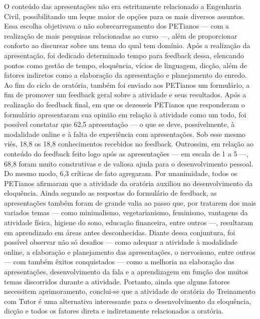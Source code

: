 O conteúdo das apresentações não era estritamente relacionado a Engenharia Civil, 
possibilitando um leque maior de opções para os mais diversos assuntos. Essa escolha objetivava 
o não sobrecarregamento dos PETianos — com a realização de mais pesquisas relacionadas ao 
curso —, além de proporcionar conforto ao discursar sobre um tema do qual tem domínio.
Após a realização da apresentação, foi dedicado determinado tempo para feedback dessa, 
elencando pontos como gestão de tempo, eloquência, vícios de linguagem, dicção, além de fatores 
indiretos como a elaboração da apresentação e planejamento do enredo. Ao fim do ciclo de 
oratória, também foi enviado aos PETianos um formulário, a fim de promover um feedback geral 
sobre a atividade e seus resultados.
Após a realização do feedback final, em que os dezesseis PETianos que responderam o 
formulário apresentaram sua opinião em relação à atividade como um todo, foi possível constatar 
que 62,5%
apresentação — o que se deve, possivelmente, à modalidade online e à falta de experiência com 
apresentações. Sob esse mesmo viés, 18,8%
os 18,8%
conhecimentos recebidos no feedback. 
Outrossim, em relação ao conteúdo do feedback feito logo após as apresentações — em 
escala de 1 a 5 —, 68,8%
foram muito construtivas e de valiosa ajuda para o desenvolvimento pessoal. Do mesmo modo, 
6,3%
críticas de fato agregaram. Por unanimidade, todos os PETianos afirmaram que a atividade da 
oratória auxiliou no desenvolvimento da eloquência.
Ainda segundo as respostas do formulário de feedback, as apresentações também foram de 
grande valia ao passo que, por tratarem dos mais variados temas — como minimalismo, 
vegetarianismo, feminismo, vantagens da atividade física, higiene do sono, educação financeira, 
entre outros —, resultaram em aprendizado em áreas antes desconhecidas.
Diante dessa conjuntura, foi possível observar não só desafios — como adequar a atividade 
à modalidade online, a elaboração e planejamento das apresentações, o nervosismo, entre outros 
— com também êxitos conquistados — como a melhoria na elaboração das apresentações, 
desenvolvimento da fala e a aprendizagem em função dos muitos temas discorridos durante a 
atividade. Portanto, ainda que alguns fatores necessitem aprimoramento, conclui-se que a atividade 
de oratória do Treinamento com Tutor é uma alternativa interessante para o desenvolvimento da 
eloquência, dicção e todos os fatores direta e indiretamente relacionados a oratória.

